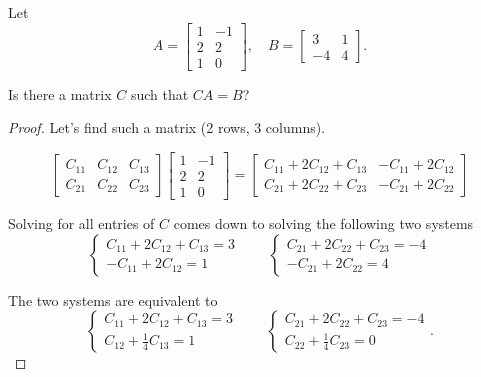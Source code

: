 \begin{exercise}
    Let
    \[
        A = \begin{bmatrix}
            1 & -1 \\
            2 & 2  \\
            1 & 0
        \end{bmatrix},
        \quad
        B = \begin{bmatrix}
            3  & 1 \\
            -4 & 4
        \end{bmatrix}.
    \]

    Is there a matrix $C$ such that $CA = B$?
\end{exercise}

\begin{proof}
    Let's find such a matrix (2 rows, 3 columns).

    \[
        \begin{bmatrix}
            C_{11} & C_{12} & C_{13} \\
            C_{21} & C_{22} & C_{23}
        \end{bmatrix}
        \begin{bmatrix}
            1 & -1 \\
            2 & 2  \\
            1 & 0
        \end{bmatrix}
        =
        \begin{bmatrix}
            C_{11} + 2{C_{12}} + C_{13} & -{C_{11}} + 2{C_{12}} \\
            C_{21} + 2{C_{22}} + C_{23} & -{C_{21}} + 2{C_{22}}
        \end{bmatrix}
    \]

    Solving for all entries of $C$ comes down to solving the following two systems
    \[
        \begin{cases}
            C_{11} + 2{C_{12}} + C_{13} = 3 \\
            -{C_{11}} + 2{C_{12}} = 1
        \end{cases}
        \qquad
        \begin{cases}
            C_{21} + 2{C_{22}} + C_{23} = -4 \\
            -{C_{21}} + 2{C_{22}} = 4
        \end{cases}
    \]

    The two systems are equivalent to
    \[
        \begin{cases}
            C_{11} + 2{C_{12}} + C_{13} = 3 \\
            {C_{12}} + \frac{1}{4}C_{13} = 1
        \end{cases}
        \qquad
        \begin{cases}
            C_{21} + 2{C_{22}} + C_{23} = -4 \\
            {C_{22}} + \frac{1}{4}C_{23} = 0
        \end{cases}.
    \]


\end{proof}
